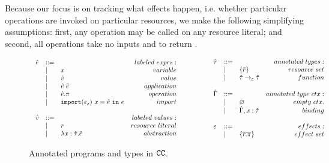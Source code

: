Because our focus is on tracking what effects happen, i.e. whether
particular operations are invoked on particular resources, we make the
following simplifying assumptions: first, any operation may be called on any
resource literal; and second, all operations take no inputs and to return
.

\begin{figure}[hbt]
\vspace*{-5mm}
\[
\begin{array}{lll}
\begin{array}{lllr}
\hat e & ::= & ~ & labeled~exprs: \\
	& | & x & variable \\
	& | & \hat v & value \\
	& | & \hat e ~ \hat e & application \\
	& | & \hat e.\pi & operation \\
	& | & \mathtt{import}(\varepsilon_s)~x = \hat e~\mathtt{in}~e & import \\
	&&\\

\hat v & ::= & ~ & labeled~values: \\
	& | & r & resource~literal\\
	& | & \lambda x: \hat \tau.\hat e & abstraction \\
\end{array}
& ~~~~~~~~&
\begin{array}{lllr}

\hat \tau & ::= & ~ & annotated ~types: \\
		& | & \{ \bar r \} & resource~set\\
		& | & \hat \tau \rightarrow_{\varepsilon} \hat \tau & function \\
		&&\\

\hat \Gamma & ::= & ~ & annotated~type~ctx:\\
				& | & \varnothing & empty~ctx.\\
				& | & \hat \Gamma, x: \hat \tau & binding \\
				&&\\

\varepsilon & ::= & ~ & effects: \\
		& | & \{ \overline{r.\pi} \} & effect~set \\
\end{array}
\end{array}
\]
\vspace*{-5mm}
\caption{Annotated programs and types in $\mathtt{CC}$.}
\vspace*{-5mm}
\label{fig:epscalc_annotated_grammar}
\end{figure}

